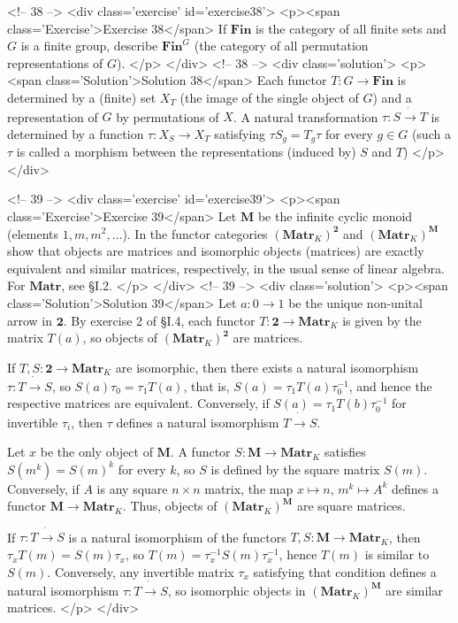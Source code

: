 <!-- 38 -->
<div class='exercise' id='exercise38'>
<p><span class='Exercise'>Exercise 38</span>
If $\mathbf{Fin}$ is the category of all finite sets and $G$ is a finite group, describe $\mathbf{Fin}^G$ (the category of all permutation representations of $G$).
</p>
</div>
<!-- 38 -->
<div class='solution'>
<p><span class='Solution'>Solution 38</span>
Each functor $T:G\to\mathbf{Fin}$ is determined by a (finite) set $X_T$ (the image of the single object of $G$) and a representation of $G$ by permutations of $X$. A natural transformation $\tau:S\dot{\to}T$ is determined by a function $\tau:X_S\to X_T$ satisfying $\tau S_g=T_g\tau$ for every $g\in G$ (such a $\tau$ is called a morphism between the representations (induced by) $S$ and $T$)
</p>
</div>

<!-- 39 -->
<div class='exercise' id='exercise39'>
<p><span class='Exercise'>Exercise 39</span>
Let $\mathbf{M}$ be the infinite cyclic monoid (elements $1,m,m^2,\ldots$). In the functor categories $(\mathbf{Matr}_K)^\mathbf{2}$ and $(\mathbf{Matr}_K)^\mathbf{M}$ show that objects are matrices and isomorphic objects (matrices) are exactly equivalent and similar matrices, respectively, in the usual sense of linear algebra. For $\mathbf{Matr}$, see \S I.2.
</p>
</div>
<!-- 39 -->
<div class='solution'>
<p><span class='Solution'>Solution 39</span>
Let $a:0\to 1$ be the unique non-unital arrow in $\mathbf{2}$. By exercise 2 of \S I.4, each functor $T:\mathbf{2}\to\mathbf{Matr}_K$ is given by the matrix $T(a)$, so objects of $(\mathbf{Matr}_K)^\mathbf{2}$ are matrices.

If $T,S:\mathbf{2}\to\mathbf{Matr}_K$ are isomorphic, then there exists a natural isomorphism $\tau:T\dot{\to}S$, so $S(a)\tau_0=\tau_1T(a)$, that is, $S(a)=\tau_1 T(a)\tau_0^{-1}$, and hence the respective matrices are equivalent. Conversely, if $S(a)=\tau_1 T(b)\tau_0^{-1}$ for invertible $\tau_i$, then $\tau$ defines a natural isomorphism $T\dot{\to} S$.

Let $x$ be the only object of $\mathbf{M}$. A functor $S:\mathbf{M}\to\mathbf{Matr}_K$ satisfies $S(m^k)=S(m)^k$ for every $k$, so $S$ is defined by the square matrix $S(m)$. Conversely, if $A$ is any square $n\times n$ matrix, the map $x\mapsto n$, $m^k\mapsto A^k$ defines a functor $\mathbf{M}\to\mathbf{Matr}_K$. Thus, objects of $(\mathbf{Matr}_K)^\mathbf{M}$ are square matrices.

If $\tau:T\dot{\to} S$ is a natural isomorphism of the functors $T,S:\mathbf{M}\to\mathbf{Matr}_K$, then $\tau_xT(m)=S(m)\tau_x$, so $T(m)=\tau_x^{-1}S(m)\tau_x^{-1}$, hence $T(m)$ is similar to $S(m)$. Conversely, any invertible matrix $\tau_x$ satisfying that condition defines a natural isomorphism $\tau:T\dot{\to}S$, so isomorphic objects in $(\mathbf{Matr}_K)^\mathbf{M}$ are similar matrices.
</p>
</div>

